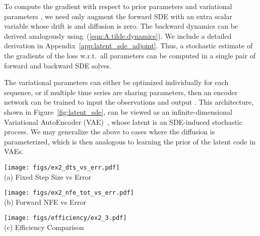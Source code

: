 \documentclass[twoside]{article}
\begin{document}
To compute the gradient with respect to prior parameters  and variational parameters , we need only augment the forward SDE with an extra scalar variable whose drift is  and diffusion is zero.
The backward dynamics can be derived analogously using~(\ref{eqn:A.tilde.dynamics}). 
We include a detailed derivation in Appendix~\ref{app:latent_sde_adjoint}.
Thus, a stochastic estimate of the gradients of the loss w.r.t.\ all parameters can be computed in a single pair of forward and backward SDE solves.

The variational parameters  can either be optimized individually for each sequence, or if multiple time series are sharing parameters, then an encoder network can be trained to input the observations and output .
This architecture, shown in Figure~\ref{fig:latent_sde}, can be viewed as an infinite-dimensional Variational AutoEncoder (VAE)~\cite{kingma2013auto,rezende2014stochastic}, whose latent is an SDE-induced stochastic process.
We may generalize the above to cases where the diffusion is parameterized, which is then analogous to learning the prior of the latent code in VAEs.
 \begin{figure*}[t]\label{fig:numerical_study}
\begin{minipage}[t]{0.33\linewidth}
\centering
{\texttt{[image: figs/ex2\_dts\_vs\_err.pdf]}} \\ \vspace{-0.10cm}
(a) \footnotesize{Fixed Step Size vs Error}
\end{minipage}
\begin{minipage}[t]{0.33\linewidth}
\centering
\texttt{[image: figs/ex2\_nfe\_tot\_vs\_err.pdf]} \\ \vspace{-0.10cm}
(b) \footnotesize{Forward NFE vs Error}
\end{minipage}
\begin{minipage}[t]{0.33\linewidth}
\centering
\texttt{[image: figs/efficiency/ex2\_3.pdf]} \\ \vspace{-0.10cm}
(c) \footnotesize{Efficiency Comparison}
\end{minipage}
\caption{
(a) Same fixed step size used in both forward and reverse simulation. Boxplot generated by repeating the experiment with different Brownian motion sample paths 64 times.
(b) Colors of dots represent tolerance levels and correspond to the colorbar on the right. 
Only \texttt{atol} was varied and \texttt{rtol} was set to .
}
\end{figure*}
\end{document}
